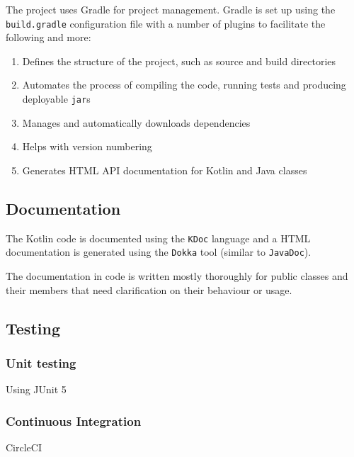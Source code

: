        The project uses Gradle for project management. Gradle is set up using the \texttt{build.gradle} configuration file with a number of plugins to facilitate the following and more:
        \begin{enumerate}
            \item Defines the structure of the project, such as source and build directories
            \item Automates the process of compiling the code, running tests and producing deployable \texttt{jar}s
            \item Manages and automatically downloads dependencies
            \item Helps with version numbering
            \item Generates HTML API documentation for Kotlin and Java classes
        \end{enumerate}
        
    \subsection{Documentation}
        
        The Kotlin code is documented using the \texttt{KDoc} language and a HTML documentation is generated using the \texttt{Dokka} tool (similar to \texttt{JavaDoc}).
        
        The documentation in code is written mostly thoroughly for public classes and their members that need clarification on their behaviour or usage.
            
    \subsection{Testing}
        
        \subsubsection{Unit testing}
            Using JUnit 5
            
        \subsubsection{Continuous Integration}
            CircleCI

